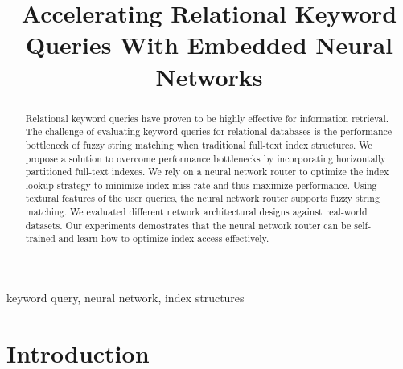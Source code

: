 \documentclass[conference]{IEEEtran}
\begin{document}
\title{
Accelerating Relational Keyword Queries With Embedded Neural Networks
}

\author{
\and
{}
\and
{}
}

\maketitle

\begin{abstract}
Relational keyword queries have proven to be highly effective for
information retrieval.  The challenge of evaluating keyword queries for
	relational databases is the performance bottleneck of fuzzy string
	matching when traditional full-text index structures.  We propose a
	solution to overcome performance bottlenecks by incorporating
	horizontally partitioned full-text indexes.  We rely on a neural
	network router to optimize the index lookup strategy to minimize index
	miss rate and thus maximize performance.  Using textural features of
	the user queries, the neural network router supports fuzzy string
	matching.  We evaluated different network architectural designs against
	real-world datasets.  Our experiments demostrates that the neural
	network router can be self-trained and learn how to optimize index
	access effectively.
\end{abstract}

\begin{IEEEkeywords}
keyword query, neural network, index structures
\end{IEEEkeywords}

\section{Introduction}
\end{document}
